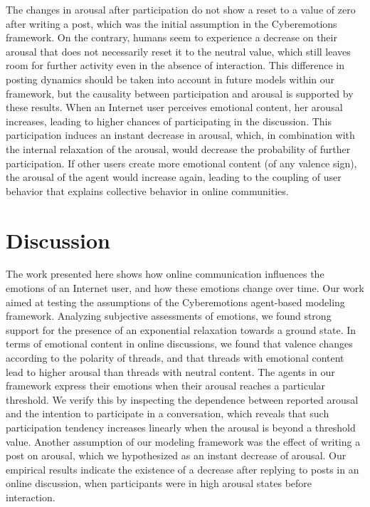 \documentclass[nologo,url,11pt,a4paper]{ETHpaper}
\begin{document}
The changes in arousal after participation do not show a reset to a value of zero
after writing a post, which was the initial assumption in the Cyberemotions
framework. On the contrary, humans seem to experience a decrease on their
arousal that does not necessarily reset it to the neutral value, which still
leaves room for further activity even in the absence of interaction. This
difference in posting dynamics should be taken into account in future models
within our framework, but the causality between participation and arousal is
supported by these results. When an Internet user perceives emotional content, her arousal increases, leading to higher chances of participating
in the discussion. This participation induces an instant decrease in
arousal, which, in combination with the internal relaxation of the
arousal, would decrease the probability of further participation.
If other users create more emotional content (of any valence sign), the
arousal of the agent would increase again, leading to the coupling of user
behavior that explains collective behavior in online communities.
 
  
\section{Discussion}

The work presented here shows how online communication influences the emotions
of an Internet user, and how these emotions change over time. Our work aimed
at testing the assumptions of the Cyberemotions agent-based modeling
framework. Analyzing subjective assessments of emotions, we found strong
support for the presence of an exponential relaxation towards a ground state.
In terms of emotional content in online discussions, we found that valence
changes according to the polarity of threads, and that threads with emotional
content lead to higher arousal than threads with neutral content. The agents
in our framework express their emotions when their arousal reaches a
particular threshold. We verify this by inspecting the dependence between
reported arousal and the intention to participate in a conversation, which
reveals that such participation tendency increases linearly when the arousal
is beyond a threshold value. Another assumption of our modeling framework was
the effect of writing a post on arousal, which we hypothesized as an instant
decrease of arousal. Our empirical results indicate the existence of a
decrease after replying to posts in an online discussion, when participants
were in high arousal states before interaction.
\end{document}
